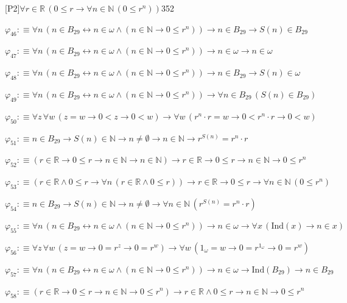 \begin{fullproof}{[P2]}{$\forall r \in \mathbb{R}\,(0 \leq r \to \forall n \in \mathbb{N}\,(0 \leq {{r}^{n}}))$}{352}
\begin{abbrevlist}
\item $\varphi_{46} :\equiv \forall n\,(n \in B_{29} \leftrightarrow n \in \omega \land (n \in \mathbb{N} \to 0 \leq {{r}^{n}})) \to n \in B_{29} \to S(n) \in B_{29}$
\item $\varphi_{47} :\equiv \forall n\,(n \in B_{29} \leftrightarrow n \in \omega \land (n \in \mathbb{N} \to 0 \leq {{r}^{n}})) \to n \in \omega \to n \in \omega$
\item $\varphi_{48} :\equiv \forall n\,(n \in B_{29} \leftrightarrow n \in \omega \land (n \in \mathbb{N} \to 0 \leq {{r}^{n}})) \to n \in B_{29} \to S(n) \in \omega$
\item $\varphi_{49} :\equiv \forall n\,(n \in B_{29} \leftrightarrow n \in \omega \land (n \in \mathbb{N} \to 0 \leq {{r}^{n}})) \to \forall n \in B_{29}\,(S(n) \in B_{29})$
\item $\varphi_{50} :\equiv \forall z\,\forall w\,(z = w \to 0 < z \to 0 < w) \to \forall w\,({{r}^{n}} \cdot r = w \to 0 < {{r}^{n}} \cdot r \to 0 < w)$
\item $\varphi_{51} :\equiv n \in B_{29} \to S(n) \in \mathbb{N} \to n \neq \emptyset \to n \in \mathbb{N} \to {{r}^{S(n)}} = {{r}^{n}} \cdot r$
\item $\varphi_{52} :\equiv (r \in \mathbb{R} \to 0 \leq r \to n \in \mathbb{N} \to n \in \mathbb{N}) \to r \in \mathbb{R} \to 0 \leq r \to n \in \mathbb{N} \to 0 \leq {{r}^{n}}$
\item $\varphi_{53} :\equiv (r \in \mathbb{R} \land 0 \leq r \to \forall n\,(r \in \mathbb{R} \land 0 \leq r)) \to r \in \mathbb{R} \to 0 \leq r \to \forall n \in \mathbb{N}\,(0 \leq {{r}^{n}})$
\item $\varphi_{54} :\equiv n \in B_{29} \to S(n) \in \mathbb{N} \to n \neq \emptyset \to \forall n \in \mathbb{N}\,({{r}^{S(n)}} = {{r}^{n}} \cdot r)$
\item $\varphi_{55} :\equiv \forall n\,(n \in B_{29} \leftrightarrow n \in \omega \land (n \in \mathbb{N} \to 0 \leq {{r}^{n}})) \to n \in \omega \to \forall x\,(\mathrm{Ind}(x) \to n \in x)$
\item $\varphi_{56} :\equiv \forall z\,\forall w\,(z = w \to 0 = {{r}^{z}} \to 0 = {{r}^{w}}) \to \forall w\,(1_{\omega} = w \to 0 = {{r}^{1_{\omega}}} \to 0 = {{r}^{w}})$
\item $\varphi_{57} :\equiv \forall n\,(n \in B_{29} \leftrightarrow n \in \omega \land (n \in \mathbb{N} \to 0 \leq {{r}^{n}})) \to n \in \omega \to \mathrm{Ind}(B_{29}) \to n \in B_{29}$
\item $\varphi_{58} :\equiv (r \in \mathbb{R} \to 0 \leq r \to n \in \mathbb{N} \to 0 \leq {{r}^{n}}) \to r \in \mathbb{R} \land 0 \leq r \to n \in \mathbb{N} \to 0 \leq {{r}^{n}}$

\end{abbrevlist}
\end{fullproof}
